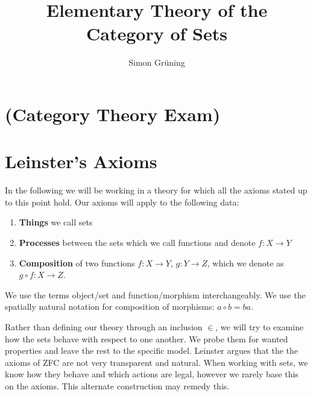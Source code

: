


\title{Elementary Theory of the Category of Sets}
\author{Simon Gr\"uning}
\address[Simon Gr\"uning]{University of Zurich, R\"{a}mistrasse 71, 8006 Zurich}

\newtheorem{axiom}{Axiom}
\setcounter{axiom}{-1}

\maketitle

\section*{(Category Theory Exam)}


\clearpage


\section{Leinster's Axioms}

\begin{remark}
In the following we will be working in a theory for which all the axioms stated up to this point hold. Our axioms will apply to the following data:

\begin{enumerate}
\item \textbf{Things} we call sets
\item \textbf{Processes} between the sets which we call functions and denote $f: X \longrightarrow Y$
\item \textbf{Composition} of two functions $f: X \longrightarrow Y$, $g: Y \longrightarrow Z$, which we denote as $g \circ f: X \longrightarrow Z$.
\end{enumerate}

We use the terms object/set and function/morphism interchangeably. We use the spatially natural notation for composition of morphisms: $a \circ b = ba$.

Rather than defining our theory through an inclusion $\in$, we will try to examine how the sets behave with respect to one another. We probe them for wanted properties and leave the rest to the specific model. Leinster argues that the the axioms of ZFC are not very transparent and natural. When working with sets, we know how they behave and which actions are legal, however we rarely base this on the axioms. This alternate construction may remedy this.
\end{remark}

